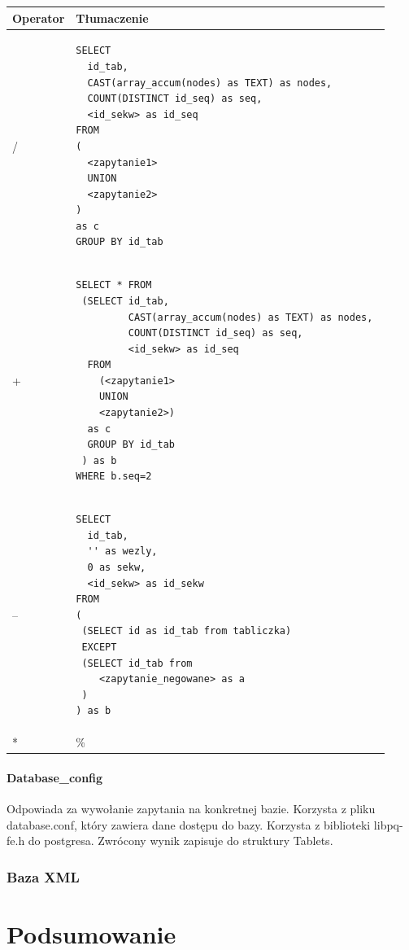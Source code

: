 \documentclass{pracamgr}
\begin{document}
\begin{longtable}{|p{1in}|p{4.5in}|}
\hline
{\bf Operator} & {\bf Tłumaczenie}\\
\hline
\endhead
/ & 
\begin{verbatim}
SELECT 
  id_tab, 
  CAST(array_accum(nodes) as TEXT) as nodes, 
  COUNT(DISTINCT id_seq) as seq,
  <id_sekw> as id_seq
FROM 
(
  <zapytanie1>
  UNION
  <zapytanie2>
)
as c
GROUP BY id_tab
\end{verbatim}
\\ 
\hline
+ &
\begin{verbatim}
SELECT * FROM
 (SELECT id_tab, 
         CAST(array_accum(nodes) as TEXT) as nodes, 
         COUNT(DISTINCT id_seq) as seq, 
         <id_sekw> as id_seq
  FROM
    (<zapytanie1>
    UNION
    <zapytanie2>)
  as c 
  GROUP BY id_tab
 ) as b
WHERE b.seq=2 
\end{verbatim}
\\ 
\hline
-- & 
\begin{verbatim}
SELECT 
  id_tab, 
  '' as wezly, 
  0 as sekw,
  <id_sekw> as id_sekw
FROM
(
 (SELECT id as id_tab from tabliczka)
 EXCEPT
 (SELECT id_tab from
    <zapytanie_negowane> as a
 )   
) as b
\end{verbatim}
\\ 
\hline
* & \%  \\ 
\hline
\end{longtable}


\subsubsection{Database\_config}
Odpowiada za wywołanie zapytania na konkretnej bazie. Korzysta z pliku database.conf, który zawiera dane dostępu do bazy. 
Korzysta z biblioteki libpq-fe.h do postgresa. Zwrócony wynik zapisuje do struktury Tablets.

\subsection{Baza XML}


\chapter{Podsumowanie}


\appendix



\begin{thebibliography}{99}


\end{thebibliography}
\end{document}

